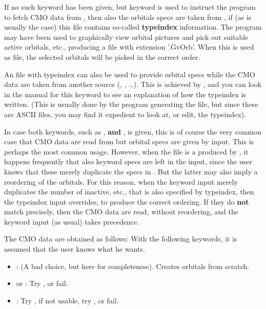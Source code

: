 If no such keyword has been given, but keyword  is used to instruct
the program to fetch CMO data from , then also the orbitals specs
are taken from , if (as is usually the case) this file contains
so-called {\bf typeindex} information. The  program may have been
used to graphically view orbital pictures and pick out suitable active orbitals,
etc., producing a file with extension '.GvOrb'. When this is used as 
file, the selected orbitals will be picked in the correct order.

An  file with typeindex can also be used to provide orbital specs while
the CMO data are taken from another source (, , \dots).
This is achieved by , and you can look in the manual for this
keyword to see an explanation of how the typeindex is written. (This is usually
done by the program generating the file, but since these are ASCII files, you may
find it expedient to look at, or edit, the typeindex).

In case both keywords, such as , {\bf and} , is
given, this is of course the very common case that CMO data are read from 
but orbital specs are given by input. This is perhaps the most common usage.
However, when the  file is a produced by , it happens
frequently that also keyword specs are left in the input, since the user knows
that these merely duplicate the specs in . But the latter may also
imply a reordering of the orbitals.
For this reason, when the keyword input merely duplicates the number of
inactive, etc., that is also specified by typeindex, then the typeindex input
overrides, to produce the correct ordering. If they do {\bf not} match precisely,
then the CMO data are read, without reordering, and the keyword input (as usual)
takes precedence.

The CMO data are obtained as follows:
With the following keywords, it is assumed that the user knows what he wants.
\begin{itemize}
\item {}: (A bad choice, but here for completeness). Creates orbitals
from scratch.
\item {} or : Try  , or fail.
\item {}: Try  , if not usable, try , or fail.
\end{itemize}

